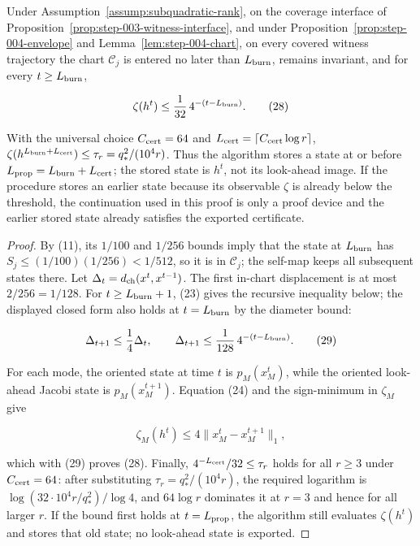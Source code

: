 \begin{proposition}\label{prop:step-004-certificate}
Under Assumption~\ref{assump:subquadratic-rank}, on the coverage interface
of Proposition~\ref{prop:step-003-witness-interface}, and under
Proposition~\ref{prop:step-004-envelope} and
Lemma~\ref{lem:step-004-chart},
on every covered witness trajectory the chart \(\mathcal C_j\) is entered no
later than \(L_{\rm burn}\), remains invariant, and for every
\(t\ge L_{\rm burn}\),

\[
\zeta(h^t)\le {1\over32}\,4^{-(t-L_{\rm burn})}.
\tag{28}
\]

With the universal choice \(C_{\rm cert}=64\) and
\(L_{\rm cert}=\lceil C_{\rm cert}\log r\rceil\),
\(\zeta(h^{L_{\rm burn}+L_{\rm cert}})\le\tau_r=q_*^2/(10^4r)\). Thus the
algorithm stores a state at or before \(L_{\rm prop}=L_{\rm burn}+L_{\rm cert}\);
the stored state is \(h^t\), not its look-ahead image. If the procedure stores
an earlier state because its observable \(\zeta\) is already below the
threshold, the continuation used in this proof is only a proof device and
the earlier stored state already satisfies the exported certificate.

\begin{proof}
By (11), its \(1/100\) and \(1/256\) bounds imply
that the state at \(L_{\rm burn}\) has
\(S_j\le(1/100)(1/256)<1/512\), so it is in \(\mathcal C_j\); the self-map
keeps all subsequent states there. Let
\(\Delta_t=d_{\rm ch}(x^t,x^{t-1})\). The first in-chart displacement is at
most \(2/256=1/128\). For \(t\ge L_{\rm burn}+1\), (23) gives the recursive
inequality below; the displayed closed form also holds at
\(t=L_{\rm burn}\) by the diameter bound:

\[
\Delta_{t+1}\le {1\over4}\Delta_t,\qquad
\Delta_{t+1}\le {1\over128}\,4^{-(t-L_{\rm burn})}.
\tag{29}
\]

For each mode, the oriented state at time \(t\) is \(p_M(x_M^t)\), while the
oriented look-ahead Jacobi state is \(p_M(x_M^{t+1})\). Equation (24) and the
sign-minimum in \(\zeta_M\) give

\[
\zeta_M(h^t)\le4\|x_M^t-x_M^{t+1}\|_1,
\]

which with (29) proves (28). Finally,
\(4^{-L_{\rm cert}}/32\le\tau_r\) holds for all \(r\ge3\) under \(C_{\rm cert}=64\):
after substituting \(\tau_r=q_*^2/(10^4r)\), the required logarithm is
\(\log(32\cdot10^4r/q_*^2)/\log4\), and \(64\log r\) dominates it at \(r=3\)
and hence for all larger \(r\). If the bound first holds at \(t=L_{\rm prop}\),
the algorithm still evaluates \(\zeta(h^t)\) and stores that old state; no
look-ahead state is exported. 

\end{proof}
\end{proposition}
